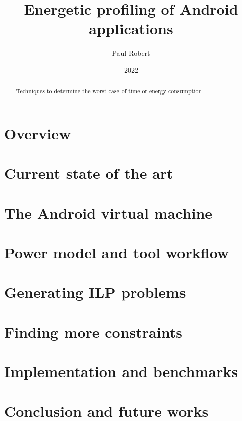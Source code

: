 \documentclass{article}
\title{Energetic profiling of Android applications}
\author{Paul Robert}
\date{2022}
\begin{document}
\maketitle

\begin{abstract}
    Techniques to determine the worst case of time or energy consumption
\end{abstract}
    
\section*{Overview}
\section*{Current state of the art}
\section*{The Android virtual machine}
\section*{Power model and tool workflow}
\section*{Generating ILP problems}

\section*{Finding more constraints}
\section*{Implementation and benchmarks}

\section*{Conclusion and future works}


\nocite{*}

\end{document}
